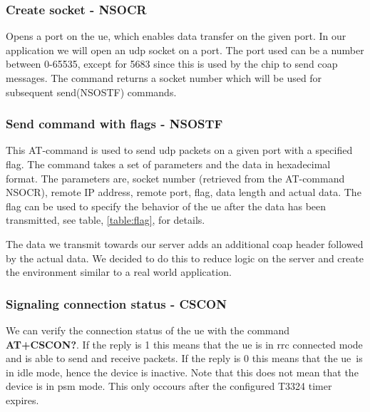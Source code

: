 \documentclass[USenglish]{ifimaster}  %
\begin{document}
\subsubsection{Create socket - NSOCR}
Opens a port on the \acrshort{ue}, which enables data transfer on the given port. In our application we will open an \acrshort{udp} socket on a port. The port used can be a number between 0-65535, except for 5683 since this is used by the chip to send \acrshort{coap} messages. The command returns a socket number which will be used for subsequent send(NSOSTF) commands.

\subsubsection{Send command with flags - NSOSTF}
This AT-command is used to send \acrshort{udp} packets on a given port with a specified flag. The command takes a set of parameters and the data in hexadecimal format. The parameters are, socket number (retrieved from the AT-command NSOCR), remote IP address, remote port, flag, data length and actual data. The flag can be used to specify the behavior of the \acrshort{ue} after the data has been transmitted, see table, \vref{table:flag}, for details.

\begin{table}[H]
\centering
{}
\caption[\acrshort{nb-iot} send command flag options]{Transmit flag options}
\label{table:flag}
\end{table}

The data we transmit towards our server adds an additional \acrshort{coap} header followed by the actual data. We decided to do this to reduce logic on the server and create the environment similar to a real world application.

\subsubsection{Signaling connection status - CSCON}
We can verify the connection status of the \acrshort{ue} with the command \textbf{AT+CSCON?}. If the reply is 1 this means that the \acrshort{ue} is in \acrshort{rrc} connected mode and is able to send and receive packets. If the reply is 0 this means that the \acrshort{ue} is in idle mode, hence the device is inactive. Note that this does not mean that the device is in \acrshort{psm} mode. This only occours after the configured \acrshort{T3324} timer expires.
\end{document}
